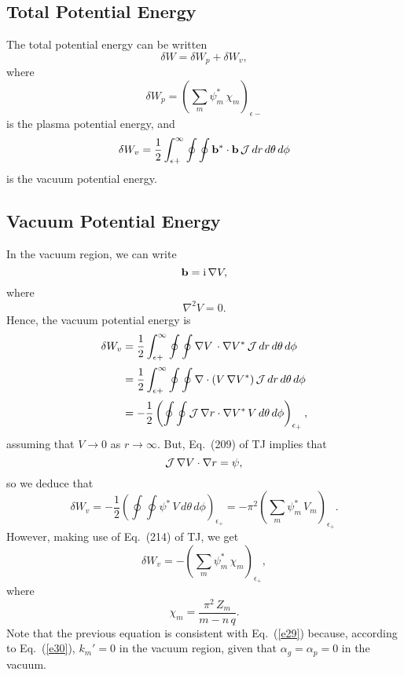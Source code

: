\documentclass[12pt,prb,aps,notitlepage]{revtex4-1}
\begin{document}
\subsection{Total Potential Energy}
The total potential energy can be written
\begin{equation}\label{e79}
\delta W= \delta W_p + \delta W_v,
\end{equation}
where
\begin{equation}\label{e80}
\delta W_p= \left(\sum_m\psi_m^\ast\,\chi_m\right)_{\epsilon-}
\end{equation}
is the plasma potential energy, 
and
\begin{equation}
\delta W_v = \frac{1}{2}\int_{\epsilon+}^\infty\oint\oint {\bf b}^\ast\cdot{\bf b} \,{\cal J}\,dr\,d\theta\,d\phi
\end{equation}
is the vacuum potential energy.

\subsection{Vacuum Potential Energy}
In the vacuum region, we can write
\begin{equation}
{\bf b} = {\rm i}\,\nabla V,
\end{equation}
where
\begin{equation}
\nabla^2 V =0.
\end{equation}
Hence, the vacuum potential energy is
\begin{align}
\delta W_v &= \frac{1}{2}\int_{\epsilon+}^\infty\oint\oint\nabla V\,\cdot\nabla V^\ast\,{\cal J}\,dr\,d\theta\,d\phi\nonumber\\[0.5ex]
&= \frac{1}{2}\int_{\epsilon+}^\infty\oint\oint  \nabla\cdot(V\,\nabla V^\ast)\,{\cal J}\,dr\,d\theta\,d\phi\nonumber\\[0.5ex]
&=-\frac{1}{2}\left(\oint\oint {\cal J}\,\nabla r\cdot\nabla V^\ast\,V\,d\theta\,d\phi\right)_{\epsilon_+},
\end{align}
assuming that $V\rightarrow 0$ as $r\rightarrow \infty$. 
But, Eq.~(209) of TJ implies that 
\begin{equation}
{\cal J}\,\nabla V\cdot\nabla r = \psi,
\end{equation}
so we deduce that
\begin{equation}\label{e87}
\delta W_v = -\frac{1}{2}\left(\oint\oint \psi^\ast\,V\,d\theta\,d\phi\right)_{\epsilon_{+}} =- \pi^2\left(\sum_m \psi_m^\ast\,V_m\right)_{\epsilon_{+}}.
\end{equation}
However, making use of Eq.~(214) of TJ, we get
\begin{equation}\label{e88}
\delta W_v =-\left(\sum_m\psi_m^\ast\,\chi_m\right)_{\epsilon_+},
\end{equation}
where
\begin{equation}\label{e89}
\chi_m=\frac{\pi^2\,Z_m}{m-n\,q}.
 \end{equation}
 Note that the previous equation is consistent with Eq.~(\ref{e29}) because, according to Eq.~(\ref{e30}),  $k_m'=0$ in the vacuum region, given that $\alpha_g=\alpha_p=0$ in the vacuum. 
\end{document}
